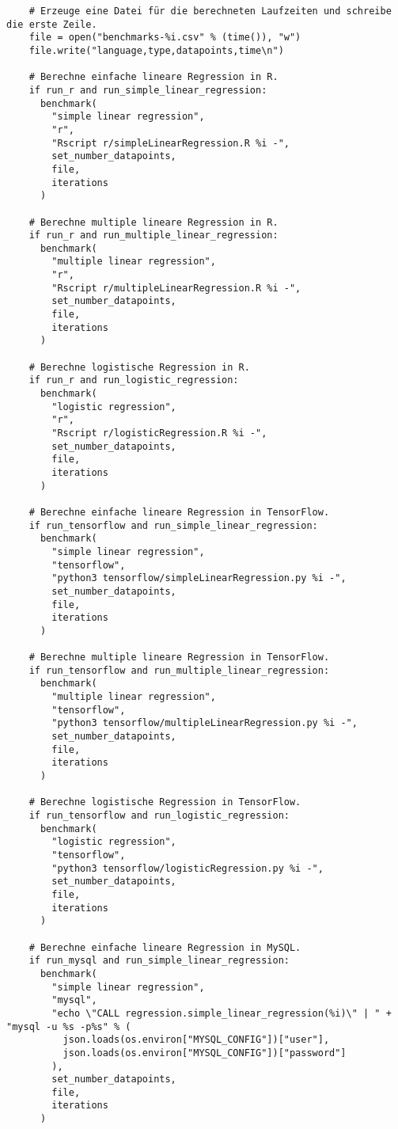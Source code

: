 \begin{verbatim}
    # Erzeuge eine Datei für die berechneten Laufzeiten und schreibe die erste Zeile.
    file = open("benchmarks-%i.csv" % (time()), "w")
    file.write("language,type,datapoints,time\n")

    # Berechne einfache lineare Regression in R.
    if run_r and run_simple_linear_regression:
      benchmark(
        "simple linear regression",
        "r",
        "Rscript r/simpleLinearRegression.R %i -",
        set_number_datapoints,
        file,
        iterations
      )

    # Berechne multiple lineare Regression in R.
    if run_r and run_multiple_linear_regression:
      benchmark(
        "multiple linear regression",
        "r",
        "Rscript r/multipleLinearRegression.R %i -",
        set_number_datapoints,
        file,
        iterations
      )

    # Berechne logistische Regression in R.
    if run_r and run_logistic_regression:
      benchmark(
        "logistic regression",
        "r",
        "Rscript r/logisticRegression.R %i -",
        set_number_datapoints,
        file,
        iterations
      )

    # Berechne einfache lineare Regression in TensorFlow.
    if run_tensorflow and run_simple_linear_regression:
      benchmark(
        "simple linear regression",
        "tensorflow",
        "python3 tensorflow/simpleLinearRegression.py %i -",
        set_number_datapoints,
        file,
        iterations
      )

    # Berechne multiple lineare Regression in TensorFlow.
    if run_tensorflow and run_multiple_linear_regression:
      benchmark(
        "multiple linear regression",
        "tensorflow",
        "python3 tensorflow/multipleLinearRegression.py %i -",
        set_number_datapoints,
        file,
        iterations
      )

    # Berechne logistische Regression in TensorFlow.
    if run_tensorflow and run_logistic_regression:
      benchmark(
        "logistic regression",
        "tensorflow",
        "python3 tensorflow/logisticRegression.py %i -",
        set_number_datapoints,
        file,
        iterations
      )

    # Berechne einfache lineare Regression in MySQL.
    if run_mysql and run_simple_linear_regression:
      benchmark(
        "simple linear regression",
        "mysql",
        "echo \"CALL regression.simple_linear_regression(%i)\" | " + "mysql -u %s -p%s" % (
          json.loads(os.environ["MYSQL_CONFIG"])["user"],
          json.loads(os.environ["MYSQL_CONFIG"])["password"]
        ),
        set_number_datapoints,
        file,
        iterations
      )


\end{verbatim}
